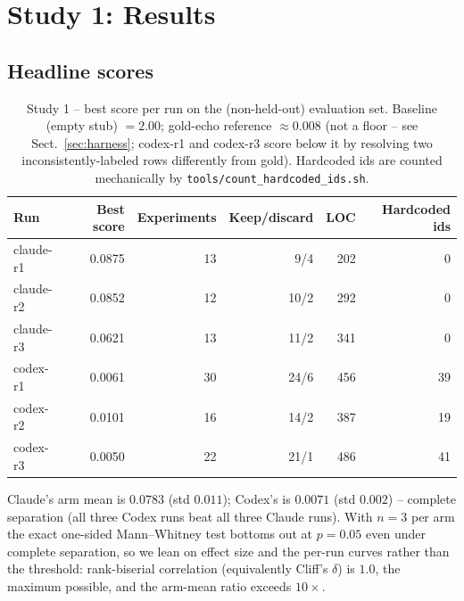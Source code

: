 \documentclass[runningheads]{llncs}
\begin{document}
\section{Study 1: Results}
\label{sec:study1-results}

\subsection{Headline scores}

\begin{table}[t]
\centering
\caption{Study 1 -- best score per run on the (non-held-out) evaluation set.
Baseline (empty stub) $=2.00$; gold-echo reference $\approx 0.008$ (not a
floor -- see Sect.~\ref{sec:harness}; codex-r1 and codex-r3 score below it
by resolving two inconsistently-labeled rows differently from gold).
Hardcoded ids are counted mechanically by
\texttt{tools/count\_hardcoded\_ids.sh}.}
\label{tab:study1-headline}
\begin{tabular}{lrrrrr}
\toprule
Run & Best score & Experiments & Keep/discard & LOC & Hardcoded ids \\
\midrule
claude-r1 & 0.0875 & 13 & 9/4  & 202 & 0 \\
claude-r2 & 0.0852 & 12 & 10/2 & 292 & 0 \\
claude-r3 & 0.0621 & 13 & 11/2 & 341 & 0 \\
codex-r1  & 0.0061 & 30 & 24/6 & 456 & 39 \\
codex-r2  & 0.0101 & 16 & 14/2 & 387 & 19 \\
codex-r3  & 0.0050 & 22 & 21/1 & 486 & 41 \\
\bottomrule
\end{tabular}
\end{table}

Claude's arm mean is $0.0783$ (std $0.011$); Codex's is $0.0071$ (std
$0.002$) -- complete separation (all three Codex runs beat all three Claude
runs). With $n=3$ per arm the exact one-sided Mann--Whitney test bottoms out
at $p=0.05$ even under complete separation, so we lean on effect size and
the per-run curves rather than the threshold: rank-biserial correlation
(equivalently Cliff's $\delta$) is $1.0$, the maximum possible, and the
arm-mean ratio exceeds $10\times$.
\end{document}
